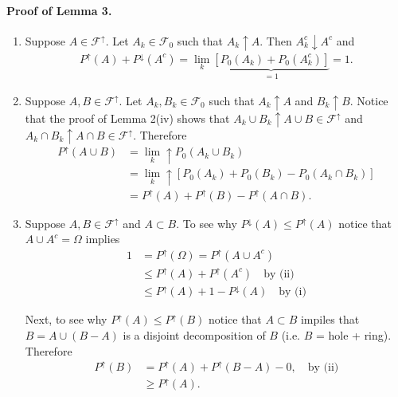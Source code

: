 \documentclass[10pt,letterpaper]{article}
\begin{document}
\paragraph{Proof of Lemma 3.}
\begin{enumerate}
\item Suppose $A\in \mathcal F^{\uparrow}$. Let $A_k\in \mathcal F_0$ such that $A_k\uparrow A$. Then $A^c_k\downarrow A^c$ and 
\begin{align}
P^\uparrow(A)+P^\downarrow(A^c)= \lim_k \underbrace{[P_0(A_k)+ P_0(A_k^c)]}_{=1}=1.
\end{align}

\item Suppose $A, B\in \mathcal F^\uparrow$. Let $A_k, B_k\in \mathcal F_0$ such that  $A_k\uparrow A$ and $B_k\uparrow B$. Notice that the proof of  Lemma 2(iv) shows that $A_k\cup B_k\uparrow A\cup B\in \mathcal F^\uparrow$ and $A_k\cap B_k \uparrow A\cap B\in\mathcal F^\uparrow$. Therefore
\begin{align*}
P^\uparrow(A\cup B)&=\lim_k\!\!\uparrow P_0(A_k\cup B_k) \\
&=\lim_k\!\!\uparrow [ P_0(A_k) + P_0( B_k)- P_0(A_k\cap B_k) ] \\
&=P^\uparrow(A) + P^\uparrow( B)- P^\uparrow(A\cap B).
\end{align*}
\item Suppose $A,B \in \mathcal F^\uparrow$ and $A\subset B$. To see why $P^\downarrow(A)\leq P^\uparrow(A)$ notice that $A\cup A^c = \Omega$ implies
\begin{align*}
1&=P^\uparrow(\Omega) = P^\uparrow (A\cup A^c)\\
&\leq  P^\uparrow (A) + P^\uparrow( A^c)\quad\text{by (ii)} \\
&\leq  P^\uparrow (A) + 1- P^\downarrow( A)\quad\text{by (i)} 
\end{align*}


Next, to see why $P^\uparrow(A)\leq P^\uparrow(B)$ notice that $A\subset B$ impiles that $B=A\cup (B- A)$ is a disjoint decomposition of $B$ (i.e. $B$ = hole + ring). Therefore
\begin{align*}
P^\uparrow(B) &= P^\uparrow(A) + P^\uparrow(B- A)-0, \quad\text{by (ii)}\\
&\geq  P^\uparrow(A).
\end{align*}



\end{enumerate}
\end{document}
